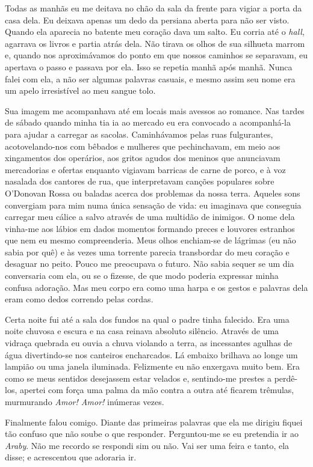 Todas as manhãs eu me deitava no chão da sala da frente para vigiar a porta da
casa dela.  Eu deixava apenas um dedo da persiana aberta para não ser visto.
Quando ela aparecia no batente meu coração dava um salto.  Eu corria até o
\textit{hall}, agarrava os livros e partia atrás dela.  Não tirava os olhos de
sua silhueta marrom e, quando nos aproximávamos do ponto em que nossos caminhos
se separavam, eu apertava o passo e passava por ela.  Isso se repetia manhã
após manhã.  Nunca falei com ela, a não ser algumas palavras casuais, e mesmo
assim seu nome era um apelo irresistível ao meu sangue tolo.

Sua imagem me acompanhava até em locais mais avessos ao romance.  Nas tardes de
sábado quando minha tia ia ao mercado eu era convocado a acompanhá-la para
ajudar a carregar as sacolas.  Caminhávamos pelas ruas fulgurantes,
acotovelando-nos com bêbados e mulheres que pechinchavam, em meio aos
xingamentos dos operários, aos gritos agudos dos meninos que anunciavam
mercadorias e ofertas enquanto vigiavam barricas de carne de porco, e à voz
nasalada dos cantores de rua, que interpretavam canções populares sobre
O’Donovan Rossa ou baladas acerca dos problemas da nossa terra.  Aqueles sons
convergiam para mim numa única sensação de vida: eu imaginava que conseguia
carregar meu cálice a salvo através de uma multidão de inimigos.  O nome dela
vinha-me aos lábios em dados momentos formando preces e louvores estranhos que
nem eu mesmo compreenderia.  Meus olhos enchiam-se de lágrimas (eu não sabia por
quê) e às vezes uma torrente parecia transbordar do meu coração e desaguar no
peito.  Pouco me preocupava o futuro.  Não sabia sequer se um dia conversaria
com ela, ou se o fizesse, de que modo poderia expressar minha confusa adoração.
Mas meu corpo era como uma harpa e os gestos e palavras dela eram como dedos
correndo pelas cordas.

Certa noite fui até a sala dos fundos na qual o padre tinha falecido.  Era uma
noite chuvosa e escura e na casa reinava absoluto silêncio.  Através de uma
vidraça quebrada eu ouvia a chuva violando a terra, as incessantes agulhas de
água divertindo-se nos canteiros encharcados.  Lá embaixo brilhava ao longe um
lampião ou uma janela iluminada.  Felizmente eu não enxergava muito bem.  Era
como se meus sentidos desejassem estar velados e, sentindo-me prestes a
perdê-los, apertei com força uma palma da mão contra a outra até ficarem
trêmulas, murmurando \textit{Amor!  Amor!} inúmeras vezes.

Finalmente falou comigo.  Diante das primeiras palavras que ela me dirigiu
fiquei tão confuso que não soube o que responder.  Perguntou-me se eu pretendia
ir ao \textit{Araby}.  Não me recordo se respondi sim ou não.  Vai ser uma
feira e tanto, ela disse; e acrescentou que adoraria ir.

